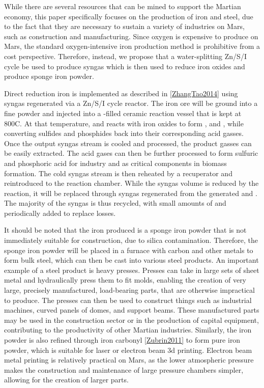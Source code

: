 \documentclass[fleqn,10pt]{Stylesheet} %
\begin{document}
While there are several resources that can be mined to support the Martian economy, this paper specifically focuses on the production of iron and steel, due to the fact that they are necessary to sustain a variety of industries on Mars, such as construction and manufacturing. Since oxygen is expensive to produce on Mars, the standard oxygen-intensive iron production method  is prohibitive from a cost perspective. Therefore, instead, we propose that a water-splitting  Zn/S/I cycle be used to produce syngas which is then used to reduce iron oxides and produce sponge iron powder.

Direct reduction iron is implemented as described in \ref{ZhangTao2014} using syngas regenerated via a Zn/S/I cycle reactor. The iron ore will be ground into a fine powder and injected into a -filled ceramic reaction vessel that is kept at 800\degree{}C. At that temperature,  and  reacts with iron oxides to form ,  and , while converting sulfides and phosphides back into their corresponding acid gasses. Once the output syngas stream is cooled and processed, the product gasses can be easily extracted. The acid gases can then be further processed to form sulfuric and phosphoric acid for industry and as critical components in biomass formation. The cold syngas stream is then reheated by a recuperator and reintroduced to the reaction chamber. While the syngas volume is reduced by the reaction, it will be replaced through syngas regenerated from the generated  and . The majority of the syngas is thus recycled, with small amounts of  and  periodically added to replace losses.

It should be noted that the iron produced is a sponge iron powder that is not immediately suitable for construction, due to silica contamination. Therefore, the sponge iron powder will be placed in a furnace with carbon and other metals to form bulk steel, which can then be cast into various steel products. An important example of a steel product is heavy presses. Presses can take in large sets of sheet metal and hydraulically press them to fit molds, enabling the creation of very large, precisely manufactured, load-bearing parts, that are otherwise impractical to produce. The presses can then be used to construct things such as industrial machines, curved panels of domes, and support beams. These manufactured parts may be used in the construction sector or in the production of capital equipment, contributing to the productivity of other Martian industries. Similarly, the iron powder is also refined through iron carbonyl \ref{Zubrin2011} to form pure iron powder, which is suitable for laser or electron beam 3d printing. Electron beam metal printing is relatively practical on Mars, as the lower atmospheric pressure makes the construction and maintenance of large pressure chambers simpler, allowing for the creation of larger parts.
\end{document}
